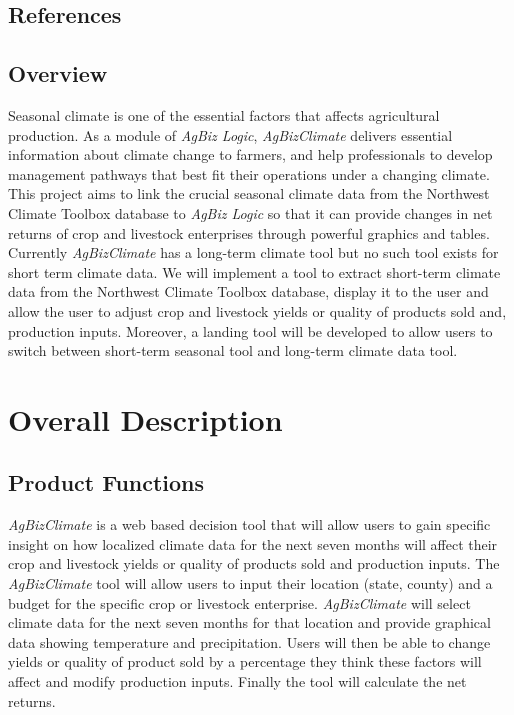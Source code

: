 \documentclass[onecolumn, draftclsnofoot,10pt, compsoc]{article}
\begin{document}
			\renewcommand\refname{\vskip -1cm}
		\subsection{References}

		\nocite{*}
    
    


		\subsection{Overview}
			Seasonal climate is one of the essential factors that affects agricultural production. As a module of \textit{AgBiz Logic}, \textit{AgBizClimate} delivers essential information about climate change to farmers, and help professionals to develop management pathways that best fit their operations under a changing climate. This project aims to link the crucial seasonal climate data from the Northwest Climate Toolbox database to \textit{AgBiz Logic} so that it can provide changes in net returns of crop and livestock enterprises through powerful graphics and tables. \\
			Currently \textit{AgBizClimate} has a long-term climate tool but no such tool exists for short term climate data. We will implement a tool to extract short-term climate data from the Northwest Climate Toolbox database, display it to the user and allow the user to adjust crop and livestock yields or quality of products sold and, production inputs. Moreover, a landing tool will be developed to allow users to switch between short-term seasonal tool and long-term climate data tool.\\
\section{Overall Description}
	\subsection {Product Functions}
				\textit{AgBizClimate} is a web based decision tool that will allow users to gain specific insight on how localized climate data for the next seven months will affect their crop and livestock yields or quality of products sold and production inputs. The \textit{AgBizClimate} tool will allow users to input their location (state, county) and a budget for the specific crop or livestock enterprise. \textit{AgBizClimate} will select climate data for the next seven months for that location and provide graphical data showing temperature and precipitation. Users will then be able to change yields or quality of product sold by a percentage they think these factors will affect and modify production inputs. Finally the tool will calculate the net returns.\\
\end{document}
